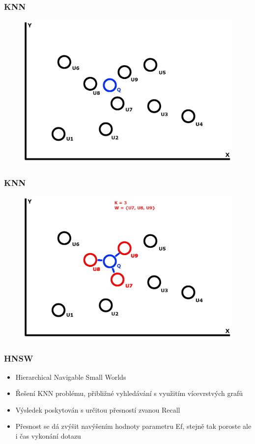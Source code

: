 \documentclass{beamer}
\begin{document}
	\begin{frame}
		\frametitle{KNN}
		\begin{figure}
			\includegraphics[scale=0.2]{figures/KNN_b2.jpg}
		\end{figure}
	\end{frame}

	\begin{frame}
		\frametitle{KNN}
		\begin{figure}
			\includegraphics[scale=0.2]{figures/KNN_b3.jpg}
		\end{figure}
	\end{frame}

	\begin{frame}
		\frametitle{HNSW}
		
		\begin{itemize}
			\item Hierarchical Navigable Small Worlds
			\item Řešení KNN problému, přibližné vyhledávání s využitím vícevrstvých grafů
			\item Výsledek poskytován s určitou přesností zvanou Recall
			\item Přesnost se dá zvýšit navýšením hodnoty parametru Ef, stejně tak poroste ale i čas vykonání dotazu
		\end{itemize}
		
	\end{frame}
\end{document}
